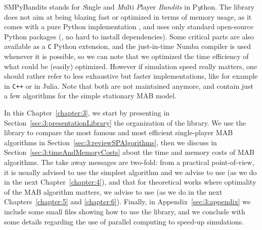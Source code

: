 

SMPyBandits stands for \emph{S}ingle and \emph{M}ulti \emph{P}layer \emph{Bandits} in P\emph{y}thon.
The library does not aim at being blazing fast or optimized in terms of memory usage, as it comes with a pure Python implementation \cite{python}, and uses only standard open-source Python packages (\ie, no hard to install dependencies).
Some critical parts are also available as a \texttt{C} Python extension, and the just-in-time Numba compiler \cite{numba} is used whenever it is possible, so we can note that we optimized the time efficiency of what could be (easily) optimized.
However if simulation speed really matters, one should rather refer to less exhaustive but faster implementations, like for example \cite{TorLibbandit} in \texttt{C++} or \cite{VishMABjl} in Julia. Note that both are not maintained anymore, and contain just a few algorithms for the simple stationary MAB model.

In this Chapter~\ref{chapter:3}, we start by presenting in Section~\ref{sec:3:presentationLibrary} the organization of the library.
We use the library to compare the most famous and most efficient single-player MAB algorithms in Section~\ref{sec:3:reviewSPAlgorithms},
then we discuss in Section~\ref{sec:3:timeAndMemoryCosts} about the time and memory costs of MAB algorithms.
The take away messages are two-fold:
from a practical point-of-view, it is usually advised to use the simplest algorithm and we advise to use \UCB{} (as we do in the next Chapter~\ref{chapter:4}),
and that for theoretical works where optimality of the MAB algorithm matters, we advise to use \klUCB{} (as we do in the next Chapters~\ref{chapter:5} and \ref{chapter:6}).
%
Finally, in Appendix~\ref{sec:3:appendix} we include some small files showing how to use the library, and we conclude with some details regarding the use of parallel computing to speed-up simulations.


